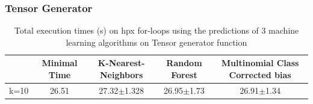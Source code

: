 \subsubsection{Tensor Generator}
\begin{table}[h]
	\centering
	\caption{Total execution times (s) on hpx for-loops using the predictions of 3 machine learning algorithms on Tensor generator function}
	\label{my-label}
	\begin{tabular}{|c|c|c|c|c|}
		\hline
		& Minimal Time&K-Nearest-Neighbors & Random Forest &Multinomial Class Corrected bias\\ \hline
		k=10  &26.51&
		27.32$\pm$1.328      & 26.95$\pm$1.73&26.91$\pm$1.34 \\ \hline
	\end{tabular}
\end{table}

